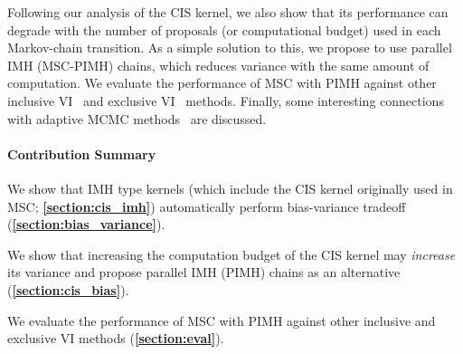 Following our analysis of the CIS kernel, we also show that its performance can degrade with the number of proposals (or computational budget) used in each Markov-chain transition.
As a simple solution to this, we propose to use parallel IMH (MSC-PIMH) chains, which reduces variance with the same amount of computation.
We evaluate the performance of MSC with PIMH against other inclusive VI~\citep{DBLP:journals/corr/BornscheinB14, NEURIPS2020_b2070693} and exclusive VI~\citep{pmlr-v33-ranganath14, JMLR:v18:16-107} methods.
Finally, some interesting connections with adaptive MCMC methods~\citep{10.1007/s11222-008-9110-y} are discussed.

\paragraph{Contribution Summary}
\begin{enumerate*}[label=\textbf{(\roman*)}]
\item We show that IMH type kernels (which include the CIS kernel originally used in MSC; \textbf{\cref{section:cis_imh}}) automatically perform bias-variance tradeoff (\textbf{\cref{section:bias_variance}}).
\item We show that increasing the computation budget of the CIS kernel may \textit{increase} its variance and propose parallel IMH (PIMH) chains as an alternative (\textbf{\cref{section:cis_bias}}).
\item We evaluate the performance of MSC with PIMH against other inclusive and exclusive VI methods (\textbf{\cref{section:eval}}).
\end{enumerate*}

